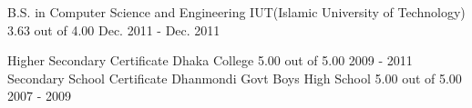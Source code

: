 

\begin{cventries}
  \cventry
    {B.S. in Computer Science and Engineering} %
    {IUT(Islamic University of Technology)} %
    { 3.63 out of 4.00} %
    {Dec. 2011 - Dec. 2011} %
    {}
    
    \vspace{-4.0mm}
    \cventry
    {Higher Secondary Certificate} %
    {Dhaka College} %
    {5.00 out of 5.00} %
    { 2009 - 2011} %
    {}
    \vspace{-4.0mm}
    \cventry
    {Secondary School Certificate} %
    {Dhanmondi Govt Boys High School} %
    {5.00 out of 5.00} %
    { 2007 - 2009} %
    {}
\end{cventries}

